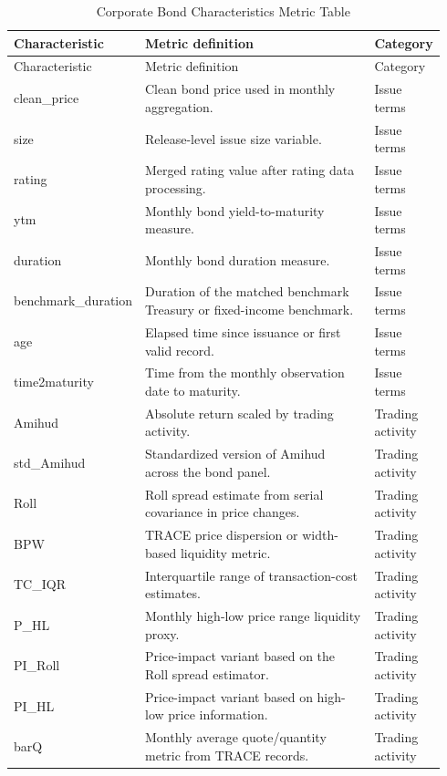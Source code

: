 \documentclass[11pt]{article}
\begin{document}
\begin{landscape}
\small
\begin{longtable}{p{0.17\linewidth}p{0.62\linewidth}p{0.15\linewidth}}
\caption{Corporate Bond Characteristics Metric Table}\label{tab:bond-formula-table}\\
\toprule
Characteristic & Metric definition & Category\\
\midrule
\endfirsthead
\toprule
Characteristic & Metric definition & Category\\
\midrule
\endhead
\bottomrule
\endfoot
clean\_price & Clean bond price used in monthly aggregation. & Issue terms \\
size & Release-level issue size variable. & Issue terms \\
rating & Merged rating value after rating data processing. & Issue terms \\
ytm & Monthly bond yield-to-maturity measure. & Issue terms \\
duration & Monthly bond duration measure. & Issue terms \\
benchmark\_duration & Duration of the matched benchmark Treasury or fixed-income benchmark. & Issue terms \\
age & Elapsed time since issuance or first valid record. & Issue terms \\
time2maturity & Time from the monthly observation date to maturity. & Issue terms \\
Amihud & Absolute return scaled by trading activity. & Trading activity \\
std\_Amihud & Standardized version of Amihud across the bond panel. & Trading activity \\
Roll & Roll spread estimate from serial covariance in price changes. & Trading activity \\
BPW & TRACE price dispersion or width-based liquidity metric. & Trading activity \\
TC\_IQR & Interquartile range of transaction-cost estimates. & Trading activity \\
P\_HL & Monthly high-low price range liquidity proxy. & Trading activity \\
PI\_Roll & Price-impact variant based on the Roll spread estimator. & Trading activity \\
PI\_HL & Price-impact variant based on high-low price information. & Trading activity \\
barQ & Monthly average quote/quantity metric from TRACE records. & Trading activity \\

\end{longtable}
\end{landscape}
\end{document}
